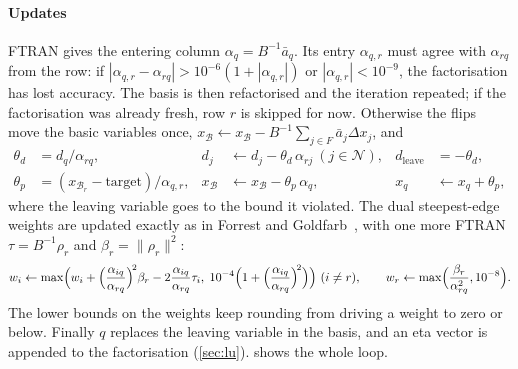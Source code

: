 \paragraph{Updates}
FTRAN gives the entering column $\alpha_q=B^{-1}\bar a_q$. Its entry $\alpha_{q,r}$ must agree with
$\alpha_{rq}$ from the row: if $|\alpha_{q,r}-\alpha_{rq}|>10^{-6}(1+|\alpha_{q,r}|)$ or
$|\alpha_{q,r}|<10^{-9}$, the factorisation has lost accuracy. The basis is then refactorised and the
iteration repeated; if the factorisation was already fresh, row $r$ is skipped for now. Otherwise the
flips move the basic variables once, $x_{\mathcal B}\leftarrow x_{\mathcal B}-B^{-1}\sum_{j\in F}\bar a_j\Delta x_j$, and
\begin{equation}\label{eq:updates}
\begin{aligned}
  \theta_d &= d_q/\alpha_{rq}, & d_j &\leftarrow d_j-\theta_d\,\alpha_{rj}\ (j\in\mathcal N), & d_{\text{leave}}&=-\theta_d,\\
  \theta_p &= (x_{\mathcal B_r}-\text{target})/\alpha_{q,r}, & x_{\mathcal B}&\leftarrow x_{\mathcal B}-\theta_p\,\alpha_q, & x_q&\leftarrow x_q+\theta_p ,
\end{aligned}
\end{equation}
where the leaving variable goes to the bound it violated. The dual steepest-edge weights are
updated exactly as in Forrest and Goldfarb~\cite{forrest1992}, with one more FTRAN $\tau=B^{-1}\rho_r$
and $\beta_r=\|\rho_r\|^2$:
\begin{equation}\label{eq:dse-update}
  w_i\leftarrow \max\Bigl(w_i + \Bigl(\frac{\alpha_{iq}}{\alpha_{rq}}\Bigr)^{\!2}\beta_r - 2\frac{\alpha_{iq}}{\alpha_{rq}}\tau_i,\;
  10^{-4}\Bigl(1+\Bigl(\frac{\alpha_{iq}}{\alpha_{rq}}\Bigr)^{\!2}\Bigr)\Bigr)\ (i\ne r),\qquad
  w_r\leftarrow\max\Bigl(\frac{\beta_r}{\alpha_{rq}^2},10^{-8}\Bigr).
\end{equation}
The lower bounds on the weights keep rounding from driving a weight to zero or below. Finally $q$
replaces the leaving variable in the basis, and an eta vector is appended to the factorisation
(\cref{sec:lu}).  shows the whole loop.

